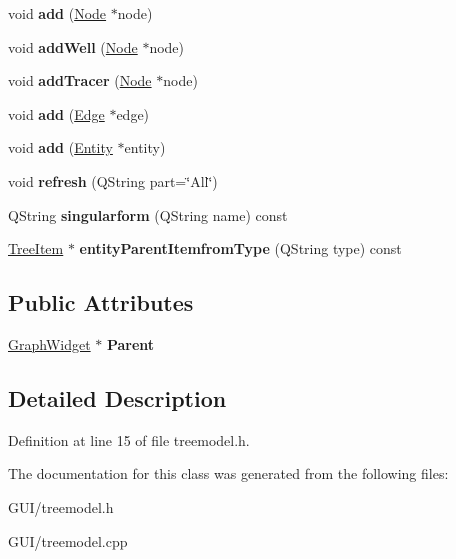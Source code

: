 \begin{DoxyCompactItemize}
\item 
\mbox{\label{class_tree_model_a07f18f367aad7d1d2fb8351111d3ffa4}} 
void {\bfseries add} (\hyperlink{class_node}{Node} $\ast$node)
\item 
\mbox{\label{class_tree_model_a913c07e9b2e6bc4564a5cdea124167a9}} 
void {\bfseries add\+Well} (\hyperlink{class_node}{Node} $\ast$node)
\item 
\mbox{\label{class_tree_model_aecddd22fd16c9571ac7a63bcaae594fa}} 
void {\bfseries add\+Tracer} (\hyperlink{class_node}{Node} $\ast$node)
\item 
\mbox{\label{class_tree_model_a8de8c90baa5fafc1a646d666e44148b6}} 
void {\bfseries add} (\hyperlink{class_edge}{Edge} $\ast$edge)
\item 
\mbox{\label{class_tree_model_ae84954004304e02c7f78dcee70f6c83f}} 
void {\bfseries add} (\hyperlink{class_entity}{Entity} $\ast$entity)
\item 
\mbox{\label{class_tree_model_abc9d939461d0025bee56d7cf870eb455}} 
void {\bfseries refresh} (Q\+String part=\char`\"{}All\char`\"{})
\item 
\mbox{\label{class_tree_model_a59b4eab1351437da4359e33927dc6813}} 
Q\+String {\bfseries singularform} (Q\+String name) const
\item 
\mbox{\label{class_tree_model_ac2fd76c1ec763036fbba7f1e4b6dd7fb}} 
\hyperlink{class_tree_item}{Tree\+Item} $\ast$ {\bfseries entity\+Parent\+Itemfrom\+Type} (Q\+String type) const
\end{DoxyCompactItemize}
\subsection*{Public Attributes}
\begin{DoxyCompactItemize}
\item 
\mbox{\label{class_tree_model_ac33c7e5a18ad5193984456d677c59c4d}} 
\hyperlink{class_graph_widget}{Graph\+Widget} $\ast$ {\bfseries Parent}
\end{DoxyCompactItemize}


\subsection{Detailed Description}


Definition at line 15 of file treemodel.\+h.



The documentation for this class was generated from the following files\+:\begin{DoxyCompactItemize}
\item 
G\+U\+I/treemodel.\+h\item 
G\+U\+I/treemodel.\+cpp\end{DoxyCompactItemize}
